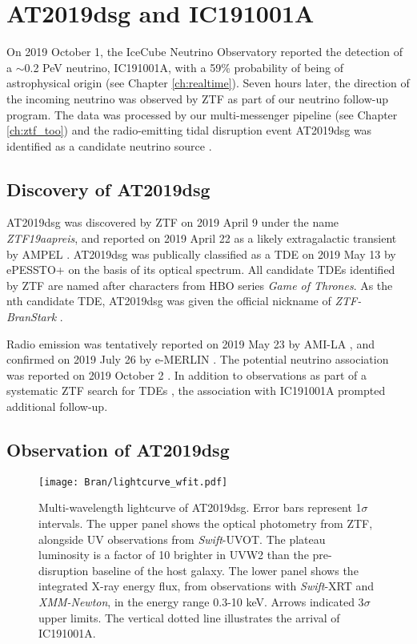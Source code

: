 \setchapterpreamble[u]{\margintoc}
\chapter{AT2019dsg and IC191001A}

On 2019 October 1, the IceCube Neutrino Observatory reported the detection of a $\sim$0.2 PeV neutrino, IC191001A, with a 59\% probability of being of astrophysical origin \cite{stein:gcn25913} (see Chapter \ref{ch:realtime}). Seven hours later, the direction of the incoming neutrino was observed by ZTF as part of our neutrino follow-up program. The data was processed by our multi-messenger pipeline (see Chapter \ref{ch:ztf_too}) and the radio-emitting tidal disruption event AT2019dsg was identified as a candidate neutrino source \cite{2019ATel13160....1S}.

\section{Discovery of AT2019dsg}

AT2019dsg was discovered by ZTF on 2019 April 9 under the name \emph{ZTF19aapreis}, and reported on 2019 April 22 as a likely extragalactic transient by AMPEL . AT2019dsg was publically classified as a TDE on 2019 May 13 by ePESSTO+ on the basis of its optical spectrum.  All candidate TDEs identified by ZTF are named after characters from HBO series \emph{Game of Thrones}. As the nth candidate TDE, AT2019dsg was given the official nickname of \emph{ZTF-BranStark} . 

Radio emission was tentatively reported on 2019 May 23 by AMI-LA \cite{2019ATel12798....1S}, and confirmed on 2019 July 26 by e-MERLIN \cite{2019ATel12960....1P}. The potential neutrino association was reported on 2019 October 2 . In addition to observations as part of a systematic ZTF search for TDEs \cite{2020arXiv200101409V}, the association with IC191001A prompted additional follow-up. 

\section{Observation of AT2019dsg}

\begin{figure}[!ht]
	\texttt{[image: Bran/lightcurve\_wfit.pdf]}
	\caption{Multi-wavelength lightcurve of AT2019dsg. Error bars represent 1$\sigma$ intervals. The upper panel shows the optical photometry from ZTF, alongside UV observations from \textit{Swift}-UVOT. The plateau luminosity is a factor of 10 brighter in UVW2 than the pre-disruption baseline of the host galaxy. The lower panel shows the integrated X-ray energy flux, from observations with \textit{Swift}-XRT and \textit{XMM-Newton}, in the energy range 0.3-10 keV. Arrows indicated 3$\sigma$ upper limits.  The vertical dotted line illustrates the arrival of IC191001A.}
	\label{fig:bran_lightcurve}
\end{figure}

